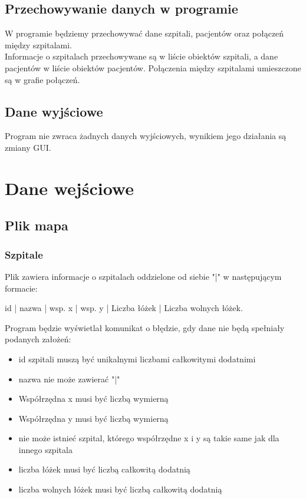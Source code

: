 \documentclass{article}
\begin{document}
\subsection{Przechowywanie danych w programie}
W programie będziemy przechowywać dane szpitali, pacjentów oraz połączeń między szpitalami.\\
Informacje o szpitalach przechowywane są w liście obiektów szpitali, a dane pacjentów w liście obiektów pacjentów. Połączenia między szpitalami umieszczone są w grafie połączeń.
\subsection{Dane wyjściowe}
Program nie zwraca żadnych danych wyjściowych, wynikiem jego działania są zmiany GUI.


\section{Dane wejściowe}

\subsection{Plik mapa}
\subsubsection{Szpitale}
Plik zawiera informacje o szpitalach oddzielone od siebie "|"  w następującym formacie: 

id | nazwa | wsp. x | wsp. y | Liczba łóżek | Liczba wolnych łóżek.

\vspace{0.5cm}
Program będzie wyświetlał komunikat o błędzie, gdy dane nie będą spełniały podanych założeń:

\begin{itemize}
\item id szpitali muszą być unikalnymi liczbami całkowitymi dodatnimi
\item nazwa nie może zawierać "|"
\item Współrzędna x musi być liczbą wymierną
\item Współrzędna y musi być liczbą wymierną
\item nie może istnieć szpital, którego współrzędne x i y są takie same jak dla innego szpitala
\item liczba łóżek musi być liczbą całkowitą dodatnią
\item liczba wolnych łóżek musi być liczbą całkowitą dodatnią
\end{itemize}
\end{document}

